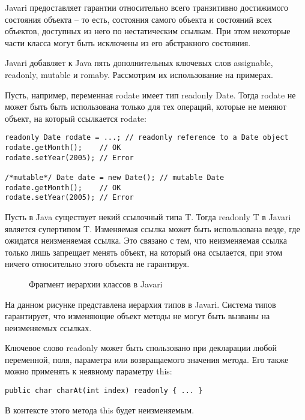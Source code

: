Javari предоставляет гарантии относительно всего транзитивно достижимого состояния объекта -- то есть, состояния самого объекта и состояний всех объектов, доступных из него по нестатическим ссылкам. При этом некоторые части класса могут быть исключены из его абстракного состояния. 

Javari добавляет к Java пять дополнительных ключевых слов assignable, readonly, mutable и romaby. Рассмотрим их использование на примерах.

Пусть, например, переменная rodate имеет тип readonly Date. Тогда rodate не может быть быть использована только для тех операций, которые не меняют объект, на который ссылкается rodate:

\begin{lstlisting}[caption=Неизменяемая ссылка, label=code:readonly_ref]
readonly Date rodate = ...; // readonly reference to a Date object 
rodate.getMonth();    // OK
rodate.setYear(2005); // Error

/*mutable*/ Date date = new Date(); // mutable Date
rodate.getMonth();    // OK
rodate.setYear(2005); // Error
\end{lstlisting}

Пусть в Java существует некий ссылочный типа T. Тогда readonly T в Javari является супертипом T. Изменяемая ссылка может быть использована везде, где ожидатся неизменяемая ссылка. Это связано с тем, что неизменяемая ссылка только лишь запрещает менять объект, на который она ссылается, при этом ничего относительно этого объекта не гарантируя. 

\begin{figure}[h]
\caption{Фрагмент иерархии классов в Javari}
\label{pic:javari_classes}
\end{figure}

На данном рисунке представлена иерархия типов в Javari. Система типов гарантирует, что изменяющие объект методы не могут быть вызваны на неизменяемых ссылках.

Ключевое слово readonly может быть спользовано при декларации любой переменной, поля, параметра или возвращаемого значения метода. Его также можно применять к неявному параметру this:

\begin{lstlisting}[caption=readonly метод, label=code:readonly_method]
public char charAt(int index) readonly { ... }
\end{lstlisting}

В контексте этого метода this будет неизменяемым.

